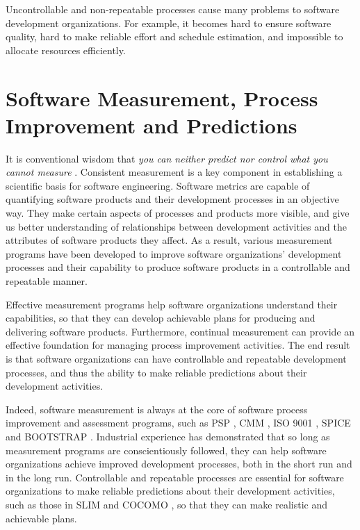 Uncontrollable and non-repeatable processes cause many problems to software development organizations. For example, it becomes hard to ensure software quality, hard to make reliable effort and schedule estimation, and impossible to allocate resources efficiently.



\section{Software Measurement, Process Improvement and Predictions}  \label{Intro:Measurement}

It is conventional wisdom that \textit{you can neither predict nor control what you cannot measure} \cite{DeMarco:1982}. Consistent measurement is a key component in establishing a scientific basis for software engineering. Software metrics are capable of quantifying software products and their development processes in an objective way. They make certain aspects of processes and products more visible, and give us better understanding of relationships between development activities and the attributes of software products they affect. As a result, various measurement programs have been developed to improve software organizations' development processes and their capability to produce software products in a controllable and repeatable manner. 

Effective measurement programs help software organizations understand their capabilities, so that they can develop achievable plans for producing and delivering software products. Furthermore, continual measurement can provide an effective foundation for managing process improvement activities. The end result is that software organizations can have controllable and repeatable development processes, and thus the ability to make reliable predictions about their development activities.

Indeed, software measurement is always at the core of software process improvement and assessment programs, such as PSP \cite{Humphrey:1995, Humphrey:1996}, CMM \cite{Humphrey:1989, Paulk:1993, Humphrey:1995}, ISO 9001 \cite{ISO9001:1987}, SPICE \cite{ISO:1998, Eman:1998} and BOOTSTRAP \cite{Kuvaja:1994}. Industrial experience \cite{Grady:1987} has demonstrated that so long as measurement programs are conscientiously followed, they can help software organizations achieve improved development processes, both in the short run and in the long run. Controllable and repeatable processes are essential for software organizations to make reliable predictions about their development activities, such as those in SLIM \cite{Putnam:1978, SLIM} and COCOMO \cite{Cocomo:1981, Cocomo:2000}, so that they can make realistic and achievable plans.

